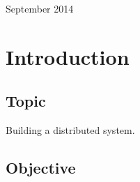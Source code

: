 \documentclass[12pt]{article}
\begin{document}
\begin{titlepage}
\begin{center}
      \vspace{5 mm}


      {\large September 2014}\\[3cm] %




      \vfill %
      \end{center}
      \end{titlepage}



  \section{Introduction}

  \subsection{Topic}

  Building a distributed system.

  \subsection{Objective}
\end{document}
